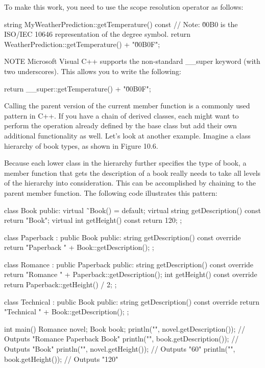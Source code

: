 To make this work, you need to use the scope resolution operator as follows:

\begin{cpp}
string MyWeatherPrediction::getTemperature() const
{
    // Note: \u00B0 is the ISO/IEC 10646 representation of the degree symbol.
    return WeatherPrediction::getTemperature() + "\u00B0F";
}
\end{cpp}

\begin{myNotic}{NOTE}
Microsoft Visual C++ supports the non-standard \_\_super keyword (with two underscores). This allows you to write the following:

\begin{cpp}
return __super::getTemperature() + "\u00B0F";
\end{cpp}
\end{myNotic}

Calling the parent version of the current member function is a commonly used pattern in C++. If you have a chain of derived classes, each might want to perform the operation already defined by the base class but add their own additional functionality as well.
Let’s look at another example. Imagine a class hierarchy of book types, as shown in Figure 10.6.


Because each lower class in the hierarchy further specifies the type of book, a member function that gets the description of a book really needs to take all levels of the hierarchy into consideration. This can be accomplished by chaining to the parent member function. The following code illustrates this pattern:

\begin{cpp}
class Book
{
    public:
        virtual ˜Book() = default;
        virtual string getDescription() const { return "Book"; }
        virtual int getHeight() const { return 120; }
};

class Paperback : public Book
{
    public:
        string getDescription() const override {
            return "Paperback " + Book::getDescription();
        }
};

class Romance : public Paperback
{
    public:
        string getDescription() const override {
            return "Romance " + Paperback::getDescription();
        }
        int getHeight() const override { return Paperback::getHeight() / 2; }
};

class Technical : public Book
{
    public:
        string getDescription() const override {
            return "Technical " + Book::getDescription();
        }
};

int main()
{
    Romance novel;
    Book book;
    println("{}", novel.getDescription()); // Outputs "Romance Paperback Book"
    println("{}", book.getDescription()); // Outputs "Book"
    println("{}", novel.getHeight()); // Outputs "60"
    println("{}", book.getHeight()); // Outputs "120"
}
\end{cpp}

